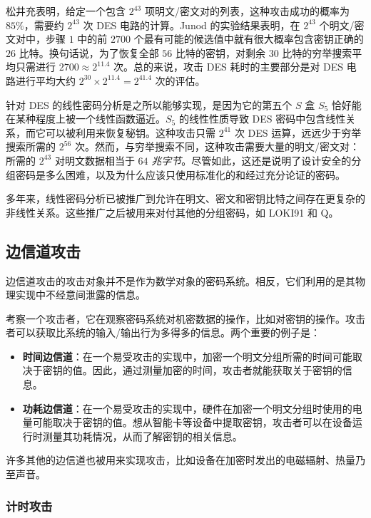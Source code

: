 \begin{snote}
松井充表明，给定一个包含 $2^{43}$ 项明文/密文对的列表，这种攻击成功的概率为 $85\%$，需要约 $2^{43}$ 次 DES 电路的计算。Junod 的实验结果表明，在 $2^{43}$ 个明文/密文对中，步骤 $1$ 中的前 $2700$ 个最有可能的候选值中就有很大概率包含密钥正确的 $26$ 比特。换句话说，为了恢复全部 $56$ 比特的密钥，对剩余 $30$ 比特的穷举搜索平均只需进行 $2700\approx 2^{11.4}$ 次。总的来说，攻击 DES 耗时的主要部分是对 DES 电路进行平均大约 $2^{30}\times 2^{11.4}=2^{41.4}$ 次的评估。
\end{snote}

\begin{snote}[教训。]
针对 DES 的线性密码分析是之所以能够实现，是因为它的第五个 $S$ 盒 $S_5$ 恰好能在某种程度上被一个线性函数逼近。$S_5$ 的线性性质导致 DES 密码中包含线性关系，而它可以被利用来恢复秘钥。这种攻击只需 $2^{41}$ 次 DES 运算，远远少于穷举搜索所需的 $2^{56}$ 次。然而，与穷举搜索不同，这种攻击需要大量的明文/密文对：所需的 $2^{43}$ 对明文数据相当于 $64$ \emph{兆字节}。尽管如此，这还是说明了设计安全的分组密码是多么困难，以及为什么应该只使用标准化的和经过充分论证的密码。

多年来，线性密码分析已被推广到允许在明文、密文和密钥比特之间存在更复杂的非线性关系。这些推广之后被用来对付其他的分组密码，如 LOKI91 和 Q。
\end{snote}

\subsection{边信道攻击}\label{subsec:4-3-2}

边信道攻击的攻击对象并不是作为数学对象的密码系统。相反，它们利用的是其物理实现中不经意间泄露的信息。

考察一个攻击者，它在观察密码系统对机密数据的操作，比如对密钥的操作。攻击者可以获取比系统的输入/输出行为多得多的信息。两个重要的例子是：
\begin{itemize}
	\item \textbf{时间边信道}：在一个易受攻击的实现中，加密一个明文分组所需的时间可能取决于密钥的值。因此，通过测量加密的时间，攻击者就能获取关于密钥的信息。
	\item \textbf{功耗边信道}：在一个易受攻击的实现中，硬件在加密一个明文分组时使用的电量可能取决于密钥的值。想从智能卡等设备中提取密钥，攻击者可以在设备运行时测量其功耗情况，从而了解密钥的相关信息。
\end{itemize}
许多其他的边信道也被用来实现攻击，比如设备在加密时发出的电磁辐射、热量乃至声音。

\subsubsection{计时攻击}

